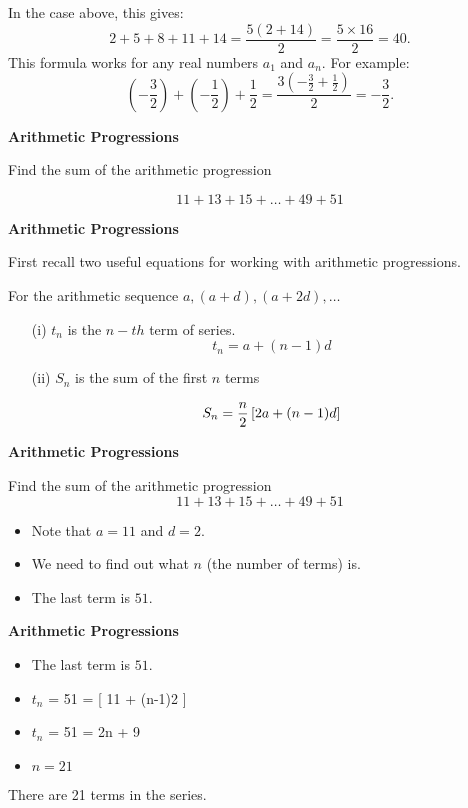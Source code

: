 \documentclass{beamer}
\begin{document}
In the case above, this gives:
\[2+5+8+11+14={\frac  {5(2+14)}{2}}={\frac  {5\times 16}{2}}=40.\]
This formula works for any real numbers $a_{1}$ and $a_{n}$. For example:
\[\left(-{\frac  {3}{2}}\right)+\left(-{\frac  {1}{2}}\right)+{\frac  {1}{2}}={\frac  {3\left(-{\frac  {3}{2}}+{\frac  {1}{2}}\right)}{2}}=-{\frac  {3}{2}}.\]


\noindent\textbf{Arithmetic Progressions}

Find the sum of the arithmetic progression
{

\[ 11 + 13 + 15 + \ldots + 49 + 51 \]
}




\noindent\textbf{Arithmetic Progressions}

First recall two useful equations for working with arithmetic progressions.\\
\bigskip


For the arithmetic sequence $a,(a+d) ,(a+2d), \ldots$

\begin{itemize}
\item[(i)] $t_n$ is the $n-th$ term of series.\[ t_n= a+(n-1)d \]

\item[(ii)] $S_n$ is the sum of the first $n$ terms

\[ S_n  = {n \over 2} \left[ 2a+(n-1)d \right] \]
\end{itemize}




\noindent\textbf{Arithmetic Progressions}

Find the sum of the arithmetic progression
{
\[ 11 + 13 + 15 + \dots + 49 + 51 \]
}
\begin{itemize}
\item Note that $a=11$ and $d=2$.
\item We need to find out what $n$ (the number of terms) is.
\item The last term is $51$.
\end{itemize}




\noindent\textbf{Arithmetic Progressions}

\begin{itemize}
\item The last term is $51$.
\item $t_n$ = 51 = [ 11 + (n-1)2 ] 
\item $t_n$ = 51 = 2n + 9
\item $n=21$
\end{itemize}
There are 21 terms in the series.
\end{document}
